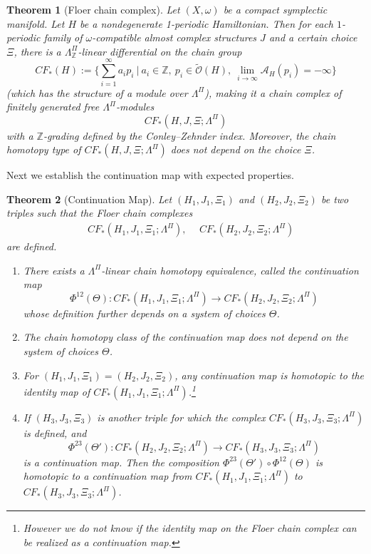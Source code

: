 \documentclass[reqno, 10pt]{amsart}
\numberwithin{equation}{section}
\numberwithin{equation}{section}
\newtheorem{thma}{Theorem}
\theoremstyle{definition}
\theoremstyle{remark}
\newcommand{\beqn}{\begin{equation*}}
\newcommand{\eeqn}{\end{equation*}}
\newcommand{\mb}{\mathbb}
\newcommand{\mc}{\mathcal}
\begin{document}
\begin{thma}[Floer chain complex]\label{thma_Floer_complex}
Let $(X, \omega)$ be a compact symplectic manifold. Let $H$ be a nondegenerate 1-periodic Hamiltonian. Then for each $1$-periodic family of $\omega$-compatible almost complex structures $J$ and a certain choice $\Xi$, there is a $\Lambda_{\mb Z}^\Pi$-linear differential on the chain group 
\beqn
CF_*(H):= \Big\{ \sum_{i=1}^\infty a_i p_i\ |\ a_i \in {\mb Z},\ p_i \in \tilde {\mc O}(H),\ \lim_{i \to \infty} {\mc A}_H(p_i) = -\infty \Big\}
\eeqn
(which has the structure of a module over $\Lambda^\Pi$), making it a chain complex of finitely generated free $\Lambda^\Pi$-modules
\beqn
CF_*(H, J, \Xi; \Lambda^\Pi)
\eeqn
with a ${\mb Z}$-grading defined by the Conley--Zehnder index. Moreover, the chain homotopy type of $CF_*(H, J, \Xi; \Lambda^\Pi)$ does not depend on the choice $\Xi$.
\end{thma}

Next we establish the continuation map with expected properties. 


\begin{thma}[Continuation Map]\label{thma_continuation_map}
Let $(H_1, J_1, \Xi_1)$ and $(H_2, J_2, \Xi_2)$ be two triples such that the Floer chain complexes
\begin{align*}
&\ CF_*(H_1, J_1, \Xi_1; \Lambda^\Pi),\ &\ CF_*(H_2, J_2, \Xi_2; \Lambda^\Pi)
\end{align*}
are defined.
\begin{enumerate}

\item There exists a $\Lambda^\Pi$-linear chain homotopy equivalence, called the continuation map
\beqn
\Phi^{12}(\Theta): CF_*(H_1, J_1, \Xi_1; \Lambda^\Pi) \to CF_*(H_2, J_2, \Xi_2; \Lambda^\Pi)
\eeqn
whose definition further depends on a system of choices $\Theta$.

\item The chain homotopy class of the continuation map does not depend on the system of choices $\Theta$. 

\item For $(H_1, J_1, \Xi_1) = (H_2, J_2, \Xi_2)$, any continuation map is homotopic to the identity map of $CF_*(H_1, J_1, \Xi_1; \Lambda^\Pi)$.\footnote{However we do not know if the identity map on the Floer chain complex can be realized as a continuation map.}

\item If $(H_3, J_3, \Xi_3)$ is another triple for which the complex $CF_*(H_3, J_3, \Xi_3; \Lambda^\Pi)$ is defined, and 
\beqn
\Phi^{23}(\Theta'): CF_*(H_2, J_2,\Xi_2; \Lambda^\Pi) \to CF_*(H_3, J_3, \Xi_3;\Lambda^\Pi)
\eeqn
is a continuation map. Then the composition $\Phi^{23}(\Theta') \circ \Phi^{12}(\Theta)$ is homotopic to a continuation map from $CF_*(H_1, J_1, \Xi_1; \Lambda^\Pi)$ to $CF_*(H_3, J_3, \Xi_3; \Lambda^\Pi)$.

\end{enumerate}
\end{thma}
\end{document}
